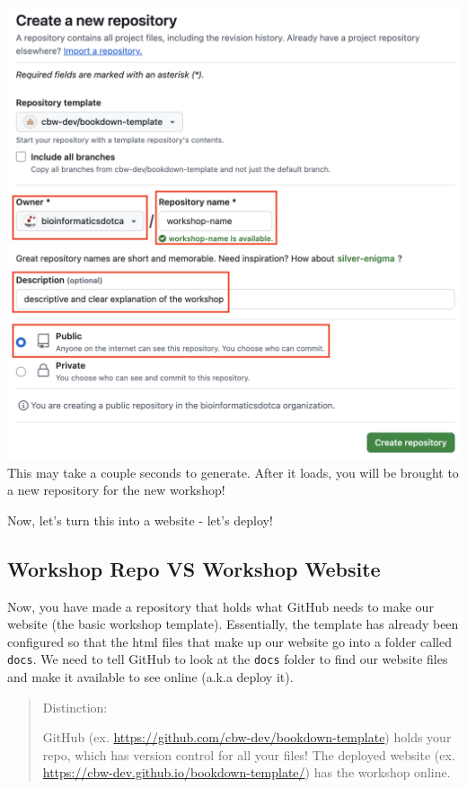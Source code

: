 \documentclass[
]{book}
\theoremstyle{definition}
\theoremstyle{definition}
\theoremstyle{definition}
\theoremstyle{definition}
\theoremstyle{remark}
\begin{document}
\begin{enumerate}
  \includegraphics{img/template/make-new-repo.png}\\

  This may take a couple seconds to generate. After it loads, you will be brought to a new repository for the new workshop!

  Now, let's turn this into a website - let's deploy!
\end{enumerate}

\subsection{Workshop Repo VS Workshop Website}\label{workshop-repo-vs-workshop-website}

Now, you have made a repository that holds what GitHub needs to make our website (the basic workshop template). Essentially, the template has already been configured so that the html files that make up our website go into a folder called \texttt{docs}. We need to tell GitHub to look at the \texttt{docs} folder to find our website files and make it available to see online (a.k.a deploy it).

\begin{quote}
Distinction:

GitHub (ex. \url{https://github.com/cbw-dev/bookdown-template}) holds your repo, which has version control for all your files! The deployed website (ex. \url{https://cbw-dev.github.io/bookdown-template/}) has the workshop online.
\end{quote}
\end{document}
